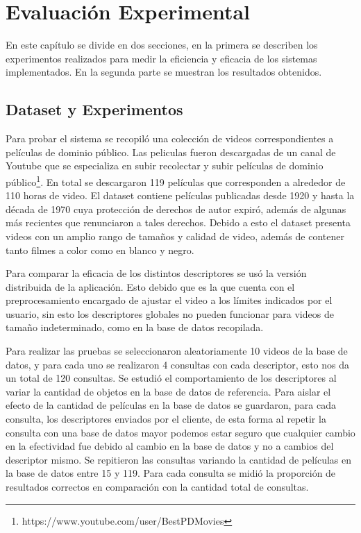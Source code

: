 \chapter{Evaluación Experimental} \label{evaluacion}
En este capítulo se divide en dos secciones, en la primera se describen los experimentos realizados para medir la eficiencia y eficacia de los sistemas implementados. En la segunda parte se muestran los resultados obtenidos.

\section{Dataset y Experimentos}\label{experimentos}
Para probar el sistema se recopiló una colección de videos correspondientes a películas de dominio público. Las peliculas fueron descargadas de un canal de Youtube que se especializa en subir recolectar y subir películas de dominio público\footnote{https://www.youtube.com/user/BestPDMovies}. En total se descargaron 119 películas que corresponden a alrededor de 110 horas de video. El dataset contiene películas publicadas desde 1920 y hasta la década de 1970 cuya protección de derechos de autor expiró, además de algunas más recientes que renunciaron a tales derechos. Debido a esto el dataset presenta videos con un amplio rango de tamaños y calidad de video, además de contener tanto filmes a color como en blanco y negro. 

Para comparar la eficacia de los distintos descriptores se usó la versión distribuida de la aplicación. Esto debido que es la que cuenta con el preprocesamiento encargado de ajustar el video a los límites indicados por el usuario, sin esto los descriptores globales no pueden funcionar para videos de tamaño indeterminado, como en la base de datos recopilada.

Para realizar las pruebas se seleccionaron aleatoriamente 10 videos de la base de datos, y para cada uno se realizaron 4 consultas con cada descriptor, esto nos da un total de 120 consultas. Se estudió el comportamiento de los descriptores al variar la cantidad de objetos en la base de datos de referencia. Para aislar el efecto de la cantidad de películas en la base de datos se guardaron, para cada consulta, los descriptores enviados por el cliente, de esta forma al repetir la consulta con una base de datos mayor podemos estar seguro que cualquier cambio en la efectividad fue debido al cambio en la base de datos y no a cambios del descriptor mismo. Se repitieron las consultas variando la cantidad de películas en la base de datos entre 15 y 119. Para cada consulta se midió la proporción de resultados correctos en comparación con la cantidad total de consultas.

